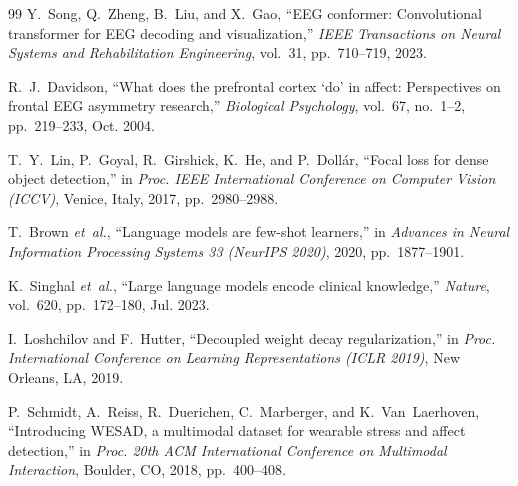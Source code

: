 \documentclass[12pt,letterpaper]{report}
\begin{document}
\begin{thebibliography}{99}
Y.~Song, Q.~Zheng, B.~Liu, and X.~Gao, ``EEG conformer: Convolutional transformer for EEG decoding and visualization,'' \textit{IEEE Transactions on Neural Systems and Rehabilitation Engineering}, vol.~31, pp.~710--719, 2023.

R.~J.~Davidson, ``What does the prefrontal cortex `do' in affect: Perspectives on frontal EEG asymmetry research,'' \textit{Biological Psychology}, vol.~67, no.~1--2, pp.~219--233, Oct. 2004.

T.~Y.~Lin, P.~Goyal, R.~Girshick, K.~He, and P.~Doll\'{a}r, ``Focal loss for dense object detection,'' in \textit{Proc. IEEE International Conference on Computer Vision (ICCV)}, Venice, Italy, 2017, pp.~2980--2988.

T.~Brown \textit{et~al.}, ``Language models are few-shot learners,'' in \textit{Advances in Neural Information Processing Systems 33 (NeurIPS 2020)}, 2020, pp.~1877--1901.

K.~Singhal \textit{et~al.}, ``Large language models encode clinical knowledge,'' \textit{Nature}, vol.~620, pp.~172--180, Jul. 2023.

I.~Loshchilov and F.~Hutter, ``Decoupled weight decay regularization,'' in \textit{Proc. International Conference on Learning Representations (ICLR 2019)}, New Orleans, LA, 2019.

P.~Schmidt, A.~Reiss, R.~Duerichen, C.~Marber\-ger, and K.~Van~Laerhoven, ``Introducing WESAD, a multimodal dataset for wearable stress and affect detection,'' in \textit{Proc. 20th ACM International Conference on Multimodal Interaction}, Boulder, CO, 2018, pp.~400--408.

\end{thebibliography}
\end{document}
